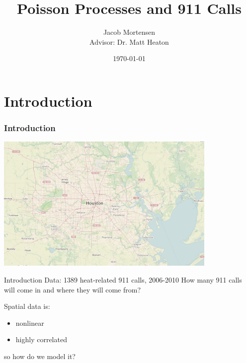 \documentclass[10pt, compress]{beamer}
\title{Poisson Processes and 911 Calls}
\date{\today}
\author{Jacob Mortensen\\ Advisor: Dr. Matt Heaton}
\institute{Brigham Young University}
\begin{document}
  \maketitle
  
  \section{Introduction}
  \begin{frame}
    \frametitle{Introduction}
    \centering
    \includegraphics[width=0.8\textwidth]{houston_map.jpg}
  \end{frame}
  \begin{frame}{Introduction}
    Data: 1389 heat-related 911 calls, 2006-2010 \newline
    \newline
    How many 911 calls will come in and where they will come from? \newline

    \centering
    \begin{minipage}{0.8\textwidth}
      Spatial data is:
      \begin{itemize}
        \item nonlinear
        \item highly correlated
      \end{itemize}
    so how do we model it?
    \end{minipage}
  \end{frame}
\end{document}

